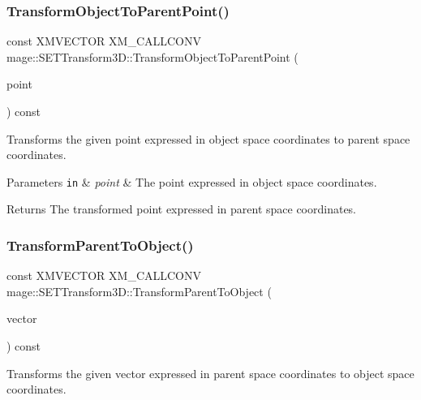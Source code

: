 \subsubsection{\texorpdfstring{Transform\+Object\+To\+Parent\+Point()}{TransformObjectToParentPoint()}}
{\footnotesize\ttfamily const X\+M\+V\+E\+C\+T\+OR X\+M\+\_\+\+C\+A\+L\+L\+C\+O\+NV mage\+::\+S\+E\+T\+Transform3\+D\+::\+Transform\+Object\+To\+Parent\+Point (\begin{DoxyParamCaption}\item[{F\+X\+M\+V\+E\+C\+T\+OR}]{point }\end{DoxyParamCaption}) const\hspace{0.3cm}{\ttfamily [noexcept]}}

Transforms the given point expressed in object space coordinates to parent space coordinates.


\begin{DoxyParams}[1]{Parameters}
\mbox{\tt in}  & {\em point} & The point expressed in object space coordinates. \\
\hline
\end{DoxyParams}
\begin{DoxyReturn}{Returns}
The transformed point expressed in parent space coordinates. 
\end{DoxyReturn}
\mbox{\label{classmage_1_1_s_e_t_transform3_d_a37334962b69953ef4884342e1ff343d0}} 
\subsubsection{\texorpdfstring{Transform\+Parent\+To\+Object()}{TransformParentToObject()}}
{\footnotesize\ttfamily const X\+M\+V\+E\+C\+T\+OR X\+M\+\_\+\+C\+A\+L\+L\+C\+O\+NV mage\+::\+S\+E\+T\+Transform3\+D\+::\+Transform\+Parent\+To\+Object (\begin{DoxyParamCaption}\item[{F\+X\+M\+V\+E\+C\+T\+OR}]{vector }\end{DoxyParamCaption}) const\hspace{0.3cm}{\ttfamily [noexcept]}}

Transforms the given vector expressed in parent space coordinates to object space coordinates.



